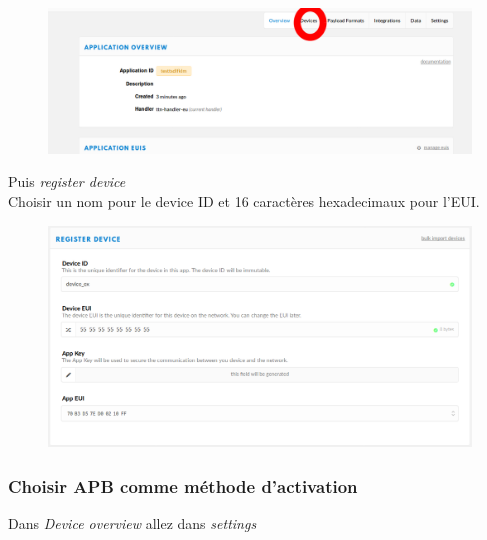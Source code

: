 \documentclass{article}
\begin{document}
        \begin{figure}[H]
\begin{center}
\advance\leftskip-3cm
\advance\rightskip-3cm
\includegraphics[keepaspectratio=true,scale=0.4]{add_device.png}
\label{visina8}
\end{center}\end{figure}

Puis \textit{register device} \\
Choisir un nom pour le device ID et 16 caractères hexadecimaux pour l'EUI.



 \begin{figure}[H]
\begin{center}
\advance\leftskip-3cm
\advance\rightskip-3cm
\includegraphics[keepaspectratio=true,scale=0.4]{device_ex_otaa.png}

\label{visina8}
\end{center}\end{figure}
 
 \subsubsection{Choisir APB comme méthode d'activation}
 Dans \textit{Device overview} allez dans \textit{settings}
 
\end{document}
